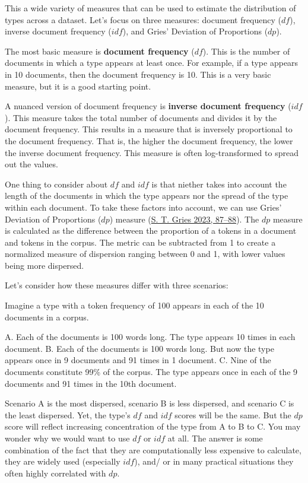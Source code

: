 \documentclass[
  letterpaper,
  DIV=11,
  numbers=noendperiod]{scrreport}
\theoremstyle{definition}
\theoremstyle{remark}
\begin{document}
This a wide variety of measures that can be used to estimate the
distribution of types across a dataset. Let's focus on three measures:
document frequency (\(df\)), inverse document frequency (\(idf\)), and
Gries' Deviation of Proportions (\(dp\)).

The most basic measure is \textbf{document frequency} (\(df\)). This is
the number of documents in which a type appears at least once. For
example, if a type appears in 10 documents, then the document frequency
is 10. This is a very basic measure, but it is a good starting point.

A nuanced version of document frequency is \textbf{inverse document
frequency} (\(idf\)). This measure takes the total number of documents
and divides it by the document frequency. This results in a measure that
is inversely proportional to the document frequency. That is, the higher
the document frequency, the lower the inverse document frequency. This
measure is often log-transformed to spread out the values.

One thing to consider about \(df\) and \(idf\) is that niether takes
into account the length of the documents in which the type appears nor
the spread of the type within each document. To take these factors into
account, we can use Gries' Deviation of Proportions (\(dp\)) measure
(\protect\hyperlink{ref-Gries2023}{S. T. Gries 2023, 87--88}). The
\(dp\) measure is calculated as the difference between the proportion of
a tokens in a document and tokens in the corpus. The metric can be
subtracted from 1 to create a normalized measure of dispersion ranging
between 0 and 1, with lower values being more dispersed.

Let's consider how these measures differ with three scenarios:

Imagine a type with a token frequency of 100 appears in each of the 10
documents in a corpus.

A. Each of the documents is 100 words long. The type appears 10 times in
each document. B. Each of the documents is 100 words long. But now the
type appears once in 9 documents and 91 times in 1 document. C. Nine of
the documents constitute 99\% of the corpus. The type appears once in
each of the 9 documents and 91 times in the 10th document.

Scenario A is the most dispersed, scenario B is less dispersed, and
scenario C is the least dispersed. Yet, the type's \(df\) and \(idf\)
scores will be the same. But the \(dp\) score will reflect increasing
concentration of the type from A to B to C. You may wonder why we would
want to use \(df\) or \(idf\) at all. The answer is some combination of
the fact that they are computationally less expensive to calculate, they
are widely used (especially \(idf\)), and/ or in many practical
situations they often highly correlated with \(dp\).
\end{document}
